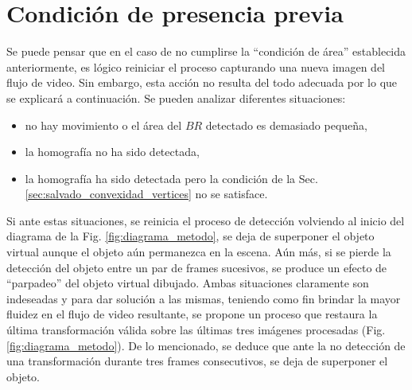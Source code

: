 \section{Condición de presencia previa}
\label{subsubsec:presente_en_alguno_3_frames_previos}
Se puede pensar que en el caso de no cumplirse la ``condición de área'' establecida anteriormente, es lógico reiniciar el proceso capturando una nueva imagen del flujo de video. Sin embargo, esta acción no resulta del todo adecuada por lo que se explicará a continuación. Se pueden analizar diferentes situaciones:
\begin{itemize}
 \item no hay movimiento o el área del $BR$ detectado es demasiado pequeña,%
 \item la homografía no ha sido detectada, %
 \item la homografía ha sido detectada pero la condición de la Sec. \ref{sec:salvado_convexidad_vertices} no se satisface.
\end{itemize}

Si ante estas situaciones, se reinicia el proceso de detección volviendo al inicio del diagrama de la Fig. \ref{fig:diagrama_metodo}, se 
deja de superponer el objeto virtual %
aunque el objeto aún permanezca en la escena. Aún más, si se pierde la detección del objeto entre un par de frames sucesivos, se produce un efecto de ``parpadeo'' del objeto virtual dibujado. Ambas situaciones claramente son indeseadas y para dar solución a las mismas, teniendo como fin brindar la mayor fluidez en el flujo de video resultante, se propone un proceso que restaura la última transformación válida sobre las últimas tres imágenes procesadas (Fig. \ref{fig:diagrama_metodo}). De lo mencionado, se deduce que ante la no detección de una transformación durante tres frames consecutivos, se deja de superponer el objeto.

